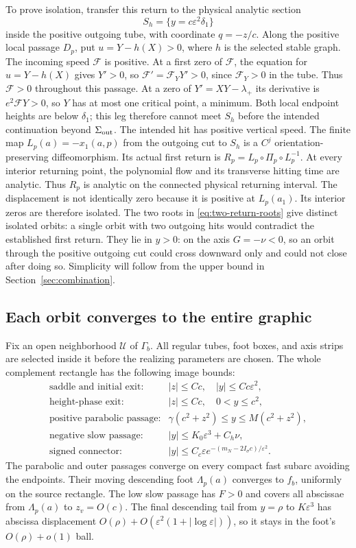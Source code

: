 To prove isolation, transfer this return to the physical analytic
section
\[
 S_h=\{y=c\varepsilon^2\delta_1\}
\]
inside the positive outgoing tube, with coordinate $q=-z/c$.
Along the positive local passage $D_p$, put $u=Y-h(X)>0$,
where $h$ is the selected stable graph.
The incoming speed $\mathcal F$ is positive. At a first zero of
$\mathcal F$, the equation for $u=Y-h(X)$ gives $Y'>0$, so
$\mathcal F'=\mathcal F_Y Y'>0$, since $\mathcal F_Y>0$ in the tube.
Thus $\mathcal F>0$ throughout this passage.
At a zero of $Y'=XY-\lambda_+$ its derivative is
$e^2\mathcal F Y>0$, so $Y$ has at most one critical point,
a minimum. Both local endpoint heights are below $\delta_1$;
this leg therefore cannot meet $S_h$ before the intended
continuation beyond $\Sigma_{\rm out}$.
The intended hit has positive vertical speed. The finite map
$L_p(a)=-x_1(a,p)$ from the outgoing cut to $S_h$ is a
$C^j$ orientation-preserving diffeomorphism. Its actual first return is
$R_p=L_p\circ\Pi_p\circ L_p^{-1}$.
At every interior returning point, the polynomial flow and its
transverse hitting time are analytic. Thus $R_p$ is analytic on the
connected physical returning interval. The displacement is not
identically zero because it is positive at $L_p(a_1)$.
Its interior zeros are therefore isolated. The two roots in
\eqref{eq:two-return-roots} give distinct isolated orbits: a single
orbit with two outgoing hits would contradict the established first
return. They lie in $y>0$: on the axis $G=-\nu<0$, so an orbit through
the positive outgoing cut could cross downward only and could not
close after doing so. Simplicity will follow from the upper bound
in Section~\ref{sec:combination}.

\subsection{Each orbit converges to the entire graphic}
Fix an open neighborhood $\mathcal U$ of $\Gamma_b$.
All regular tubes, foot boxes, and axis strips are selected inside it
before the realizing parameters are chosen. The whole complement
rectangle has the following image bounds:
\[
 \begin{array}{ll}
 \text{saddle and initial exit:}&|z|\le Cc,\quad |y|\le Cc\varepsilon^2,\\
 \text{height-phase exit:}&|z|\le Cc,\quad 0<y\le c^2,\\
 \text{positive parabolic passage:}&
             \gamma(c^2+z^2)\le y\le M(c^2+z^2),\\
 \text{negative slow passage:}&
             |y|\le K_0\varepsilon^3+C_h\nu,\\
 \text{signed connector:}&
             |y|\le C_c\varepsilon
                        e^{-(m_N-2I_\sigma c)/\varepsilon^2}.
 \end{array}
\]
The parabolic and outer passages converge on every compact fast
subarc avoiding the endpoints. Their moving descending foot
$\Lambda_p(a)$ converges to $f_b$, uniformly on the source
rectangle. The low slow passage has $F>0$ and covers all
abscissae from $\Lambda_p(a)$ to $z_v=O(c)$.
The final descending tail from $y=\rho$ to $K\varepsilon^3$
has abscissa displacement
$O(\rho)+O(\varepsilon^2(1+|\log\varepsilon|))$,
so it stays in the foot's $O(\rho)+o(1)$ ball.

